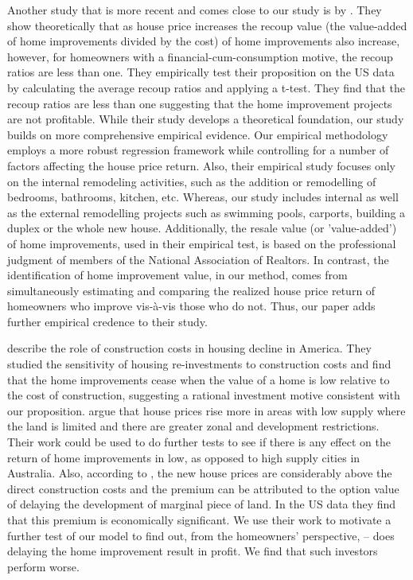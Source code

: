 \documentclass[AEJ,reqno, draftmode]{AEA} %
\begin{document}
Another study that is more recent and comes close to our study is by \citet{choi2014speculating}. They show theoretically that as house price increases the recoup value (the value-added of home improvements divided by the cost) of home improvements also increase, however, for homeowners with a financial-cum-consumption motive, the recoup ratios are less than one. They empirically test their proposition on the US data by calculating the average recoup ratios and applying a t-test. They find that the recoup ratios are less than one suggesting that the home improvement projects are not profitable. While their study develops a theoretical foundation, our study builds on more comprehensive empirical evidence. Our empirical methodology employs a more robust regression framework while controlling for a number of factors affecting the house price return. Also, their empirical study focuses only on the internal remodeling activities, such as the addition or remodelling of bedrooms, bathrooms, kitchen, etc. Whereas, our study includes internal as well as the external remodelling projects such as swimming pools, carports, building a duplex or the whole new house. Additionally, the resale value (or 'value-added') of home improvements, used in their empirical test, is based on the professional judgment of members of the National Association of Realtors. In contrast, the identification of home improvement value, in our method, comes from simultaneously estimating and comparing the realized house price return of homeowners who improve vis-à-vis those who do not. Thus, our paper adds further empirical credence to their study. 

\cite{gyourko2004reinvestment} describe the role of construction costs in housing decline in America. They studied the sensitivity of housing re-investments to construction costs and find that the home improvements cease when the value of a home is low relative to the cost of construction, suggesting a rational investment motive consistent with our proposition. \citet{glaeser2008housing} argue that house prices rise more in areas with low supply where the land is limited and there are greater zonal and development restrictions. Their work could be used to do further tests to see if there is any effect on the return of home improvements in low, as opposed to high supply cities in Australia. Also, according to \citet{guthrie2010house}, the new house prices are considerably above the direct construction costs and the premium can be attributed to the option value of delaying the development of marginal piece of land. In the US data they find that this premium is economically significant. We use their work to motivate a further test of our model to find out, from the homeowners' perspective, -- does delaying the home improvement result in profit. We find that such investors perform worse.  
\end{document}
